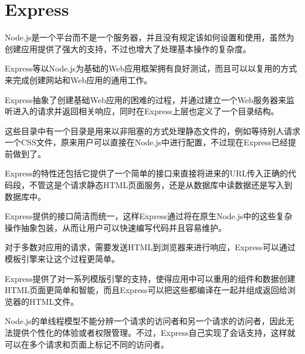 \begin{lstlisting}[language=JavaScript]

\end{lstlisting}






\begin{lstlisting}[language=JavaScript]

\end{lstlisting}






\begin{lstlisting}[language=JavaScript]

\end{lstlisting}







\section{Express}

Node.js是一个平台而不是一个服务器，并且没有规定该如何设置和使用，虽然为创建应用提供了强大的支持，不过也增大了处理基本操作的复杂度。

Express等以Node.js为基础的Web应用框架拥有良好测试，而且可以以复用的方式来完成创建网站和Web应用的通用工作。

Express抽象了创建基础Web应用的困难的过程，并通过建立一个Web服务器来监听进入的请求并返回相关响应，同时在Express上层也定义了一个目录结构。

这些目录中有一个目录是用来以非阻塞的方式处理静态文件的，例如等待别人请求一个CSS文件，原来用户可以直接在Node.js中进行配置，不过现在Express已经提前做到了。

Express的特性还包括它提供了一个简单的接口来直接将进来的URL传入正确的代码段，不管这是个请求静态HTML页面服务，还是从数据库中读数据还是写入到数据库中。

Express提供的接口简洁而统一，这样Express通过将在原生Node.js中的这些复杂操作抽象包装，从而让用户可以快速编写代码并且容易维护。

对于多数对应用的请求，需要发送HTML到浏览器来进行响应，Express可以通过模板引擎来让这个过程更简单。

Express提供了对一系列模版引擎的支持，使得应用中可以重用的组件和数据创建HTML页面更简单和智能，而且Express可以把这些都编译在一起并组成返回给浏览器的HTML文件。

Node.js的单线程模型不能分辨一个请求的访问者和另一个请求的访问者，因此无法提供个性化的体验或者权限管理。不过，Express自己实现了会话支持，这样就可以在多个请求和页面上标记不同的访问者。

